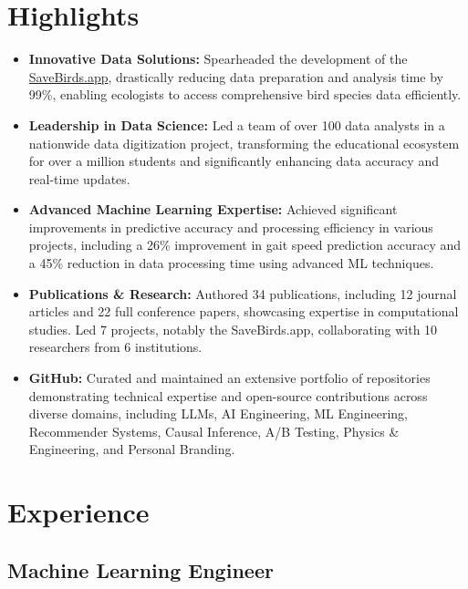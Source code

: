 \documentclass[11pt]{article}
\begin{document}
\section{Highlights}
\begin{itemize}[itemsep=5pt]
	\item \textbf{Innovative Data Solutions:} Spearheaded the development of the \href{https://savebirds.app/}{SaveBirds.app}, drastically reducing data preparation and analysis time by 99\%, enabling ecologists to access comprehensive bird species data efficiently.
	\item \textbf{Leadership in Data Science:} Led a team of over 100 data analysts in a nationwide data digitization project, transforming the educational ecosystem for over a million students and significantly enhancing data accuracy and real-time updates.
	\item \textbf{Advanced Machine Learning Expertise:} Achieved significant improvements in predictive accuracy and processing efficiency in various projects, including a 26\% improvement in gait speed prediction accuracy and a 45\% reduction in data processing time using advanced ML techniques.
	\item \textbf{Publications \& Research:} Authored 34 publications, including 12 journal articles and 22 full conference papers, showcasing expertise in computational studies. Led 7 projects, notably the SaveBirds.app, collaborating with 10 researchers from 6 institutions. 
	\item \textbf{GitHub:} Curated and maintained an extensive portfolio of repositories demonstrating technical expertise and open-source contributions across diverse domains, including LLMs, AI Engineering, ML Engineering, Recommender Systems, Causal Inference, A/B Testing, Physics \& Engineering, and Personal Branding.
\end{itemize}

\section{Experience}
\subsection{Machine Learning Engineer}
\end{document}
